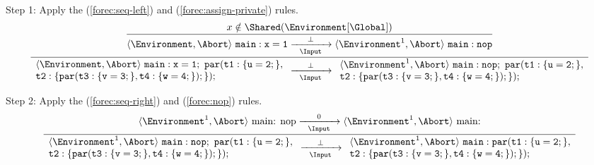 \noindent
Step 1: Apply the (\ref{forec:seq-left}) and (\ref{forec:assign-private}) rules. 
\begin{equation*}
	\frac{
		\dfrac{
				x \notin \Shared(\Environment[\Global])
			}{
				\langle \Environment, \Abort \rangle ~ \mathtt{main: x=1}
					\xrightarrow[~~\Input~~]{\bot} 
				\langle \Environment^1, \Abort \rangle ~ \mathtt{main: nop}
			}
		}{
			\begin{array}{l}
				\langle \Environment, \Abort \rangle ~ \mathtt{main: x=1;~par(t1:\{u=2;\},}	\\
				\mathtt{t2:\{par(t3:\{v=3;\}, t4:\{w=4;\} );\});}				\\
			\end{array}
				\xrightarrow[~~\Input~~]{\bot} 
			\begin{array}{l}
				\langle \Environment^1, \Abort \rangle ~ \mathtt{main: nop;~par(t1:\{u=2;\},}	\\
				\mathtt{t2:\{par( t3:\{v=3;\},t4:\{w=4;\} );\} );}				\\
			\end{array}
		}
\end{equation*}

\noindent
Step 2: Apply the (\ref{forec:seq-right}) and (\ref{forec:nop}) rules. 
\begin{equation*}
	\frac{
			\langle \Environment^1, \Abort \rangle ~ \text{main: nop}
				\xrightarrow[~~\Input~~]{0} 
			\langle \Environment^1, \Abort \rangle ~ \text{main:}
		}{
			\begin{array}{l}
				\langle \Environment^1, \Abort \rangle ~ \mathtt{main: nop;~par(t1:\{u=2;\},}	\\
				\mathtt{t2:\{par(t3:\{v=3;\}, t4:\{w=4;\} );\});}				\\
			\end{array}
				\xrightarrow[~~\Input~~]{\bot} 
			\begin{array}{l}
				\langle \Environment^1, \Abort \rangle ~ \mathtt{main: par(t1:\{u=2;\},}		\\
				\mathtt{t2:\{par( t3:\{v=3;\},t4:\{w=4;\} );\} );}				\\
			\end{array}
		}
\end{equation*}

